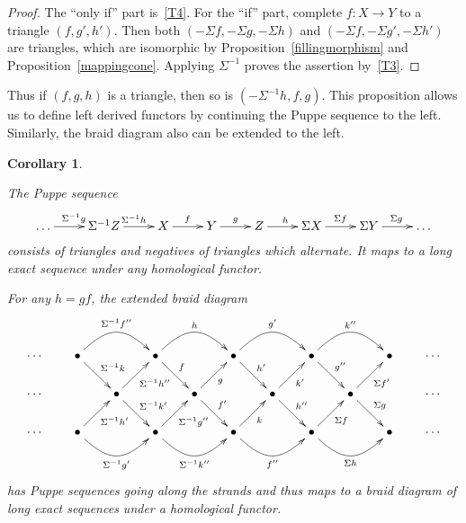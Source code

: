 \documentclass{amsproc}
\newtheorem{cor}[prop]{Corollary}
\theoremstyle{definition}
\begin{document}
\begin{proof}
The ``only if'' part is~\ref{T4}. For the ``if'' part, complete $f:X{\longrightarrow} Y$ to a triangle $(f,g',h')$. Then both $(-\Sigma f,-\Sigma g,-\Sigma h)$ and $(-\Sigma f,-\Sigma g',-\Sigma h')$ are triangles, which are isomorphic by Proposition~\ref{fillingmorphism} and Proposition~\ref{mappingcone}. Applying $\Sigma^{-1}$ proves the assertion by~\ref{T3}.
\end{proof}

Thus if $(f,g,h)$ is a triangle, then so is $(-\Sigma^{-1}h,f,g)$. This proposition allows us to define left derived functors by continuing the Puppe sequence to the left. Similarly, the braid diagram also can be extended to the left.

\begin{cor}
\begin{compactenum}
\item The Puppe sequence
\begin{displaymath}
\xymatrix{{\ldots}\ar[r]^{\Sigma^{-1}g} & {\Sigma^{-1}Z}\ar[r]^{\Sigma^{-1}h} & X\ar[r]^f & Y\ar[r]^g & Z\ar[r]^h & {\Sigma X}\ar[r]^{\Sigma f} & {\Sigma Y}\ar[r]^{\Sigma g} & {\ldots}}
\end{displaymath}
consists of triangles and negatives of triangles which alternate. It maps to a long exact sequence under any homological functor.
\item For any $h=gf$, the extended braid diagram
\begin{displaymath}
\xymatrix@-4pt{{\cdots} & {\bullet}\ar@(ru,lu)[rr]^{\Sigma^{-1}f''}\ar[rd]^{\Sigma^{-1}k} && {\bullet}\ar@(ru,lu)[rr]^h\ar[rd]^f & & {\bullet}\ar@(ru,lu)[rr]^{g'}\ar[rd]^{h'} & & {\bullet}\ar@(ru,lu)[rr]^{k''}\ar[rd]^{g''} & & {\bullet} & \cdots\\
\cdots && {\bullet}\ar[rd]^{\Sigma^{-1}k'}\ar[ru]_{\Sigma^{-1}h''} && {\bullet}\ar[ur]_g\ar[rd]^{f'} & & {\bullet}\ar[ru]_{k'}\ar[rd]^{h''} & & {\bullet}\ar[ru]_{\Sigma f'}\ar[rd]^{\Sigma g} & & {\cdots}\\
{\cdots} & {\bullet}\ar[ru]_{\Sigma^{-1}h'}\ar@(rd,ld)[rr]_{\Sigma^{-1}g'} && {\bullet}\ar@(rd,ld)[rr]_{\Sigma^{-1}k''}\ar[ru]_{\Sigma^{-1}g''} && {\bullet}\ar@(rd,ld)[rr]_{f''}\ar[ru]_{k} & & {\bullet}\ar[ru]_{\Sigma f}\ar@(rd,ld)[rr]_{\Sigma h} & & {\bullet} & {\cdots}}
\end{displaymath}
has Puppe sequences going along the strands and thus maps to a braid diagram of long exact sequences under a homological functor.
\end{compactenum}
\end{cor}
\end{document}
